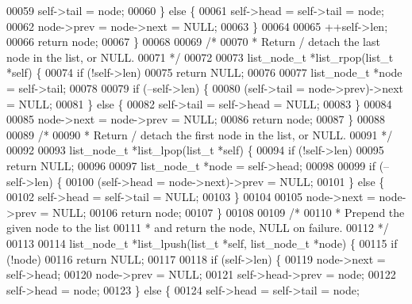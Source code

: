 \begin{DoxyCode}
00059     \textcolor{keyword}{self}->tail = node;
00060   \} \textcolor{keywordflow}{else} \{
00061     \textcolor{keyword}{self}->head = \textcolor{keyword}{self}->tail = node;
00062     node->prev = node->next = NULL;
00063   \}
00064 
00065   ++\textcolor{keyword}{self}->len;
00066   \textcolor{keywordflow}{return} node;
00067 \}
00068 
00069 \textcolor{comment}{/*}
00070 \textcolor{comment}{ * Return / detach the last node in the list, or NULL.}
00071 \textcolor{comment}{ */}
00072 
00073 list_node_t *list_rpop(list_t *\textcolor{keyword}{self}) \{
00074   \textcolor{keywordflow}{if} (!self->len)
00075     \textcolor{keywordflow}{return} NULL;
00076 
00077   list_node_t *node = \textcolor{keyword}{self}->tail;
00078 
00079   \textcolor{keywordflow}{if} (--self->len) \{
00080     (\textcolor{keyword}{self}->tail = node->prev)->next = NULL;
00081   \} \textcolor{keywordflow}{else} \{
00082     \textcolor{keyword}{self}->tail = \textcolor{keyword}{self}->head = NULL;
00083   \}
00084 
00085   node->next = node->prev = NULL;
00086   \textcolor{keywordflow}{return} node;
00087 \}
00088 
00089 \textcolor{comment}{/*}
00090 \textcolor{comment}{ * Return / detach the first node in the list, or NULL.}
00091 \textcolor{comment}{ */}
00092 
00093 list_node_t *list_lpop(list_t *\textcolor{keyword}{self}) \{
00094   \textcolor{keywordflow}{if} (!self->len)
00095     \textcolor{keywordflow}{return} NULL;
00096 
00097   list_node_t *node = \textcolor{keyword}{self}->head;
00098 
00099   \textcolor{keywordflow}{if} (--self->len) \{
00100     (\textcolor{keyword}{self}->head = node->next)->prev = NULL;
00101   \} \textcolor{keywordflow}{else} \{
00102     \textcolor{keyword}{self}->head = \textcolor{keyword}{self}->tail = NULL;
00103   \}
00104 
00105   node->next = node->prev = NULL;
00106   \textcolor{keywordflow}{return} node;
00107 \}
00108 
00109 \textcolor{comment}{/*}
00110 \textcolor{comment}{ * Prepend the given node to the list}
00111 \textcolor{comment}{ * and return the node, NULL on failure.}
00112 \textcolor{comment}{ */}
00113 
00114 list_node_t *list_lpush(list_t *\textcolor{keyword}{self}, list_node_t *node) \{
00115   \textcolor{keywordflow}{if} (!node)
00116     \textcolor{keywordflow}{return} NULL;
00117 
00118   \textcolor{keywordflow}{if} (self->len) \{
00119     node->next = \textcolor{keyword}{self}->head;
00120     node->prev = NULL;
00121     \textcolor{keyword}{self}->head->prev = node;
00122     \textcolor{keyword}{self}->head = node;
00123   \} \textcolor{keywordflow}{else} \{
00124     \textcolor{keyword}{self}->head = \textcolor{keyword}{self}->tail = node;

\end{DoxyCode}
